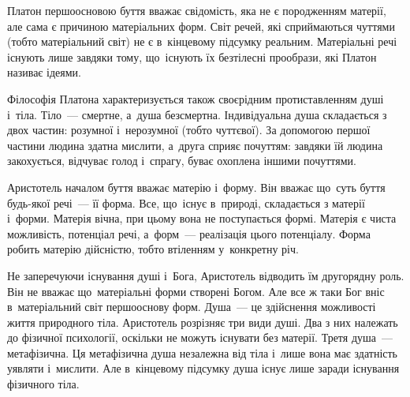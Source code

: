 \documentclass[a5paper,oneside,DIV=12,12pt,headings=small]{scrartcl}
\begin{document}
		Платон першоосновою буття вважає свідомість, яка не є породженням матерії, але сама є причиною матеріальних форм. Світ речей, які сприймаються чуттями (тобто матеріальний світ) не є в~кінцевому підсумку реальним. Матеріальні речі існують лише завдяки тому, що~існують їх безтілесні прообрази, які Платон називає ідеями.
		
		Філософія Платона характеризується також своєрідним протиставленням душі і~тіла. Тіло~— смертне, а~душа безсмертна.
		Індивідуальна душа складається з двох частин: розумної і~нерозумної (тобто чуттєвої). За допомогою першої частини людина здатна мислити, а~друга сприяє почуттям: завдяки їй людина закохується, відчуває голод і~спрагу, буває охоплена іншими почуттями.

		Аристотель началом буття вважає матерію і~форму. Він вважає що~суть буття будь-якої речі~— її форма. Все, що~існує в~природі, складається з матерії і~форми. Матерія вічна, при цьому вона не поступається формі. Матерія є чиста можливість, потенціал речі, а~форм~— реалізація цього потенціалу. Форма робить матерію дійсністю, тобто втіленням у~конкретну річ.
		
		Не заперечуючи існування душі і~Бога, Аристотель відводить їм другорядну роль. Він не вважає що~матеріальні форми створені Богом. Але все ж таки Бог вніс в~матеріальний світ першооснову форм. Душа~— це здійснення можливості життя природного тіла. Аристотель розрізняє три види душі. Два з них належать до фізичної психології, оскільки не можуть існувати без матерії. Третя душа~— метафізична. Ця метафізична душа незалежна від тіла і~лише вона має здатність уявляти і~мислити. Але в~кінцевому підсумку душа існує лише заради існування фізичного тіла.
		
\end{document}
